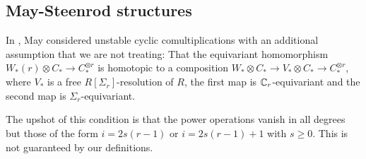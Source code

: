 \subsection{May-Steenrod structures}

In \cite{may1970general}, May considered unstable cyclic comultiplications with an additional assumption that we are not treating: That %
the equivariant homomorphism $W_*(r)\otimes C_*\to C_*^{\otimes r}$ is homotopic to a composition $W_*\otimes C_*\to V_*\otimes C_*\to C_*^{\otimes r}$, where $V_*$ is a free $R[\Sigma_r]$-resolution of $R$, the first map is $\mathbb{C}_r$-equivariant and the second map is $\Sigma_r$-equivariant.

The upshot of this condition is that the power operations vanish in all degrees but those of the form $i = 2s(r-1)$ or $i = 2s(r-1)+1$ with $s\geq 0$. This is not guaranteed by our definitions.